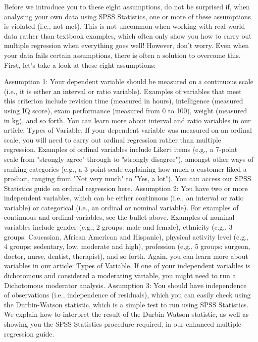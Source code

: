 \documentclass[]{article}
\begin{document}
	Before we introduce you to these eight assumptions, do not be surprised if, when analysing your own data using SPSS Statistics, one or more of these assumptions is violated (i.e., not met). This is not uncommon when working with real-world data rather than textbook examples, which often only show you how to carry out multiple regression when everything goes well! However, don’t worry. Even when your data fails certain assumptions, there is often a solution to overcome this. First, let's take a look at these eight assumptions:
	
	Assumption 1: Your dependent variable should be measured on a continuous scale (i.e., it is either an interval or ratio variable). Examples of variables that meet this criterion include revision time (measured in hours), intelligence (measured using IQ score), exam performance (measured from 0 to 100), weight (measured in kg), and so forth. You can learn more about interval and ratio variables in our article: Types of Variable. If your dependent variable was measured on an ordinal scale, you will need to carry out ordinal regression rather than multiple regression. Examples of ordinal variables include Likert items (e.g., a 7-point scale from "strongly agree" through to "strongly disagree"), amongst other ways of ranking categories (e.g., a 3-point scale explaining how much a customer liked a product, ranging from "Not very much" to "Yes, a lot"). You can access our SPSS Statistics guide on ordinal regression here.
	Assumption 2: You have two or more independent variables, which can be either continuous (i.e., an interval or ratio variable) or categorical (i.e., an ordinal or nominal variable). For examples of continuous and ordinal variables, see the bullet above. Examples of nominal variables include gender (e.g., 2 groups: male and female), ethnicity (e.g., 3 groups: Caucasian, African American and Hispanic), physical activity level (e.g., 4 groups: sedentary, low, moderate and high), profession (e.g., 5 groups: surgeon, doctor, nurse, dentist, therapist), and so forth. Again, you can learn more about variables in our article: Types of Variable. If one of your independent variables is dichotomous and considered a moderating variable, you might need to run a Dichotomous moderator analysis.
	Assumption 3: You should have independence of observations (i.e., independence of residuals), which you can easily check using the Durbin-Watson statistic, which is a simple test to run using SPSS Statistics. We explain how to interpret the result of the Durbin-Watson statistic, as well as showing you the SPSS Statistics procedure required, in our enhanced multiple regression guide.
\end{document}
